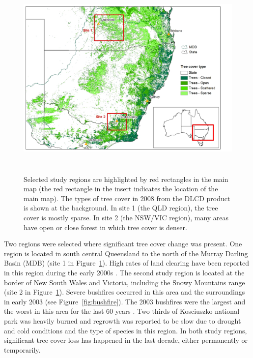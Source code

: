 \documentclass[onecolumn,referee]{svjour3}
\begin{document}
\begin{figure}[ht!]
  \centerline{\includegraphics[height = 4in,scale=0.5]{map_selreg.jpg}}
  \caption{Selected study regions are highlighted by red rectangles in the main map (the red rectangle in the insert indicates the location of the main map). The types of tree cover in 2008 from the DLCD product is shown at the background. In site 1 (the QLD region), the tree cover is mostly sparse. In site 2 (the NSW/VIC region), many areas have open or close forest in which tree cover is denser.}
  \label{fig:sel_reg}
\end{figure}

Two regions were selected where significant tree cover change was present. One region is located in south central Queensland to the north of the Murray Darling Basin (MDB) (site 1 in Figure~\ref{fig:sel_reg}). High rates of land clearing have been reported in this region during the early 2000s \citep{SLATS2004}. The second study region is located at the border of New South Wales and Victoria, including the Snowy Mountains range (site 2 in Figure~\ref{fig:sel_reg}). Severe bushfires occurred in this area and the surroundings in early 2003 (see Figure~\ref{fig:bushfire}). The 2003 bushfires were the largest and the worst in this area for the last 60 years \citep{Fire2011}. Two thirds of Kosciuszko national park was heavily burned and regrowth was reported to be slow due to drought and cold conditions \citep{ABC2003} and the type of species in this region. In both study regions, significant tree cover loss has happened in the last decade, either permanently or temporarily.
\end{document}
